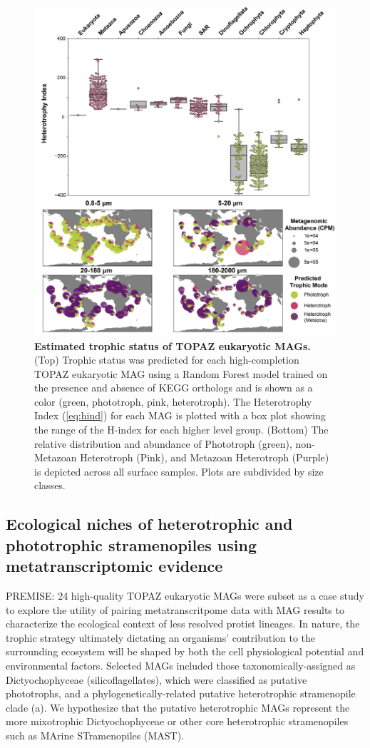 \documentclass[12pt]{article}
\numberwithin{equation}{section}
\begin{document}
\begin{figure}[h!]    
    \centering
    \includegraphics[width = 0.9\columnwidth]{figures/Figure4_Trophic_Mode_v2-01.png}
    \caption{\textbf{Estimated trophic status of TOPAZ eukaryotic MAGs.} (Top) Trophic status was predicted for each high-completion TOPAZ eukaryotic MAG using a Random Forest model trained on the presence and absence of KEGG orthologs and is shown as a color (green, phototroph, pink, heterotroph). The Heterotrophy Index (\cref{eq:hind})  for each MAG is plotted with a box plot showing the range of the H-index for each higher level group. (Bottom) The relative distribution and abundance of Phototroph (green), non-Metazoan Heterotroph (Pink), and Metazoan Heterotroph (Purple) is depicted across all surface samples. Plots are subdivided by size classes. }
    \label{fig:fig4-trophy}
\end{figure}

\subsection*{Ecological niches of heterotrophic and phototrophic stramenopiles using metatranscriptomic evidence}

PREMISE: 24 high-quality TOPAZ eukaryotic MAGs were subset as a case study to explore the utility of pairing metatranscritpome data with MAG results to characterize the ecological context of less resolved protist lineages. In nature, the trophic strategy ultimately dictating an organisms' contribution to the surrounding ecosystem will be shaped by both the cell physiological potential and environmental factors. Selected MAGs included those taxonomically-assigned as Dictyochophyceae (silicoflagellates), which were classified as putative phototrophs, and a phylogenetically-related putative heterotrophic stramenopile clade (a). We hypothesize that the putative heterotrophic MAGs represent the more mixotrophic Dictyochophyceae or other core heterotrophic stramenopiles such as MArine STramenopiles (MAST). 
\end{document}
